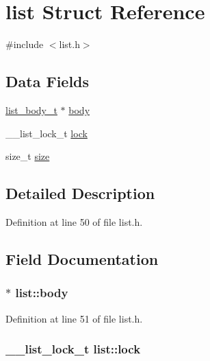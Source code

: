 \hypertarget{structlist}{\section{list Struct Reference}
\label{structlist}
}


{\ttfamily \#include $<$list.\+h$>$}

\subsection*{Data Fields}
\begin{DoxyCompactItemize}
\item 
\hyperlink{list_8h_a26009b16c17e2336df1025f49f3ebd7e}{list\+\_\+body\+\_\+t} $\ast$ \hyperlink{structlist_a86cadf6e44fd6505728c5149b336d3db}{body}
\item 
\+\_\+\+\_\+list\+\_\+lock\+\_\+t \hyperlink{structlist_a59893e59e3f090a886894244b0dc0643}{lock}
\item 
size\+\_\+t \hyperlink{structlist_ae581be90bd8eb7051528b61ad216de88}{size}
\end{DoxyCompactItemize}


\subsection{Detailed Description}


Definition at line 50 of file list.\+h.



\subsection{Field Documentation}
\hypertarget{structlist_a86cadf6e44fd6505728c5149b336d3db}{
\subsubsection[{body}]{$\ast$ list\+::body}}\label{structlist_a86cadf6e44fd6505728c5149b336d3db}


Definition at line 51 of file list.\+h.

\hypertarget{structlist_a59893e59e3f090a886894244b0dc0643}{
\subsubsection[{lock}]{\setlength{\rightskip}{0pt plus 5cm}\+\_\+\+\_\+list\+\_\+lock\+\_\+t list\+::lock}}\label{structlist_a59893e59e3f090a886894244b0dc0643}


